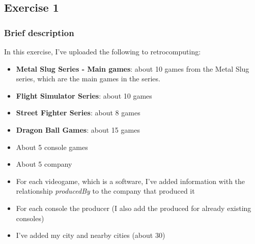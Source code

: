\subsection{Exercise 1}

\subsubsection{Brief description}


In this exercise, I've uploaded the following to retrocomputing:
\begin{itemize}
    \item \textbf{Metal Slug Series - Main games}: about 10 games from the Metal Slug series, which are the main games in the series.
    \item \textbf{Flight Simulator Series}: about 10 games
    \item \textbf{Street Fighter Series}: about 8 games
    \item \textbf{Dragon Ball Games}: about 15 games
    \item About 5 console games
    \item About 5 company
    \item For each videogame, which is a software, I've added information with the relationship \textit{producedBy} to the company that produced it
    \item For each console the producer (I also add the produced for already existing consoles)
    \item I've added my city and nearby cities (about 30)
\end{itemize}



